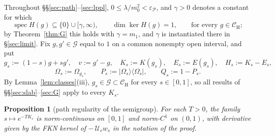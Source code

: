\documentclass[11pt,a4paper]{article}
\theoremstyle{plain}
\newtheorem{proposition}[theorem]{Proposition}
\theoremstyle{definition}
\theoremstyle{plain}
\theoremstyle{definition}
\newcommand{\G}{\mathcal{G}}
\newcommand{\CH}{\mathcal{C}_{\mathrm H}}
\newcommand{\Om}{\Omega}
\DeclareMathOperator{\spec}{spec}
\begin{document}
Throughout \S\S\ref{sec:path}--\ref{sec:lppl}, $0\le\lambda/m_0^2<\varepsilon_{\mathscr P}$,
and $\gamma>0$ denotes a constant for which
\begin{equation}
 \spec H(g)\subseteq\{0\}\cup[\gamma,\infty),\qquad \dim\ker H(g)=1,
 \qquad\text{for every }g\in\CH ;
 \tag{G$_\gamma$}\label{eq:Ggamma}
\end{equation}
by Theorem~\ref{thm:G} this holds with $\gamma=m_1$, and $\gamma$ is instantiated there in
\S\ref{sec:limit}. Fix $g,g'\in\G$ equal to $1$ on a common nonempty open interval, and put
\[
 g_s:=(1-s)g+sg',\quad v:=g'-g,\quad K_s:=K(g_s),\quad E_s:=E(g_s),\quad H_s:=K_s-E_s,
\]
\[
 \Om_s:=\Om_{g_s},\qquad P_s:=|\Om_s\rangle\langle\Om_s|,\qquad Q_s:=1-P_s .
\]
By Lemma~\ref{lem:classes}(iii), $g_s\in\G\subset\CH$ for every $s\in[0,1]$, so all results
of \S\S\ref{sec:slab}--\ref{sec:G} apply to every $K_s$.

\begin{proposition}[path regularity of the semigroup]\label{prop:pathreg}
For each $T>0$, the family $s\mapsto e^{-TK_s}$ is norm-continuous on $[0,1]$ and
norm-$C^1$ on $(0,1)$, with derivative given by the FKN kernel of $-\,\mathcal U_vw_s$
in the notation of the proof.
\end{proposition}
\end{document}
